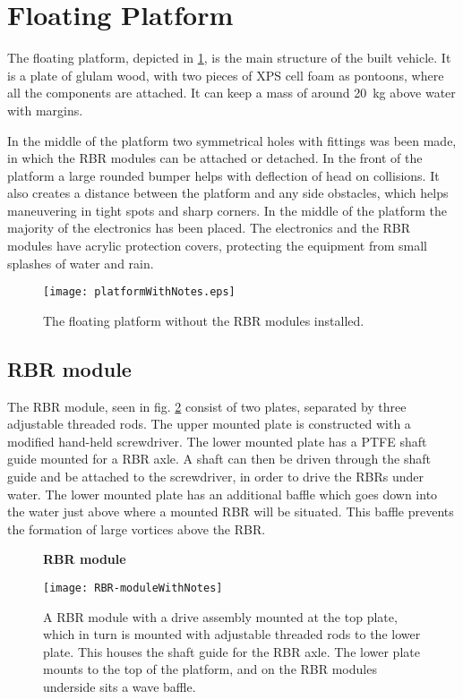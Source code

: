 \section{Floating Platform}
The floating platform, depicted in
\cref{fig:floatingPlatform}, is the main structure of the built vehicle.
It is a plate of glulam wood, with two pieces of XPS cell foam as
pontoons, where all the components are attached. It can keep a mass of
around 20~kg above water with margins.

In the middle of the platform two symmetrical holes with fittings was
been made, in which the RBR modules can be attached or detached. In the front of the platform a large rounded bumper helps with deflection of head on collisions. It also creates a distance between the platform and
any side obstacles, which helps maneuvering in tight spots and sharp corners. In the
middle of the platform the majority of the electronics has been placed. The electronics and the RBR modules have acrylic
protection covers, protecting the equipment from small splashes of water and rain.

\begin{figure}[h]
   \centering
   \texttt{[image: platformWithNotes.eps]}
   \caption{The floating platform without the RBR modules installed.}
   \label{fig:floatingPlatform}
\end{figure}

\subsection{RBR module}
The RBR module, seen in fig. \ref{fig:rbr-module} consist of two plates, separated by three adjustable threaded
rods. The upper mounted plate is constructed with a modified hand-held screwdriver. The lower mounted
plate has a PTFE shaft guide mounted for a RBR axle. A shaft can then be driven through the shaft guide and be attached to the screwdriver, in order to drive the RBRs under water. The lower mounted plate has an
additional baffle which goes down into the water just above where a mounted RBR
will be situated. This baffle prevents the formation of large vortices above the RBR. 

\begin{figure}[H]
  \centering
  \textbf{RBR module}
  \par\medskip
  \texttt{[image: RBR-moduleWithNotes]}
  \caption{A RBR module with a drive assembly mounted at the top plate,
    which in turn is mounted with adjustable threaded rods to the lower plate. This houses the shaft guide for the RBR axle. The lower plate mounts to the
    top of the platform, and on the RBR modules underside sits a wave baffle.}\label{fig:rbr-module}
\end{figure}

